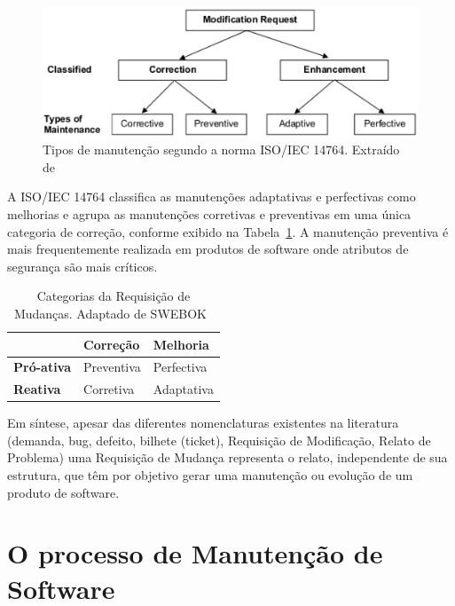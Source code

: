 \begin{figure}[hbtp]
\centering
\includegraphics[width=.75\textwidth]{chapter-intro/img/modification_request.eps}
\caption{Tipos de manutenção segundo a norma ISO/IEC 14764. Extraído
	de~\cite{1703974}}
\label{fig:modification-request}
\end{figure}

A ISO/IEC 14764 classifica as manutenções adaptativas e perfectivas como
melhorias e agrupa as manutenções corretivas e preventivas em uma única
categoria de correção, conforme exibido na
Tabela~\ref{tab:categorias_requisicao_mudanca}. A manutenção preventiva é mais
frequentemente realizada em produtos de software onde atributos de segurança são
mais críticos.

\begin{table}[htpb]
	\centering
	\caption{Categorias da Requisição de Mudanças. Adaptado de
		SWEBOK~\cite{4425813}}\label{tab:categorias_requisicao_mudanca}
	\begin{tabular}{l|l|l|}
		\cline{2-3}
	 & \textbf{Correção} & \textbf{Melhoria} \\ \hline
	 \multicolumn{1}{|l|}{\textbf{Pró-ativa}} & Preventiva & Perfectiva \\ \hline
	 \multicolumn{1}{|l|}{\textbf{Reativa}} & Corretiva & Adaptativa \\ \hline
	\end{tabular}
 \end{table} 

Em síntese, apesar das diferentes nomenclaturas existentes na literatura
(demanda, bug, defeito, bilhete (ticket), Requisição de Modificação, Relato de
Problema) uma Requisição de Mudança representa o relato, independente de sua
estrutura, que têm por objetivo gerar uma manutenção ou evolução de um produto
de software. 
 
 \section{O processo de Manutenção de Software}
\label{sec:o_processo_de_manutecao_de_software}

